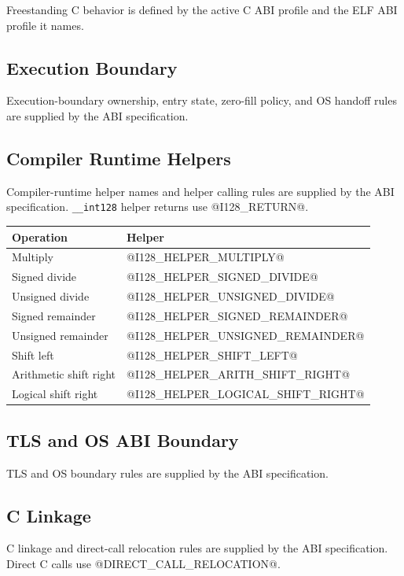 Freestanding C behavior is defined by the active C ABI profile and the ELF ABI
profile it names.

\subsection{Execution Boundary}
Execution-boundary ownership, entry state, zero-fill policy, and OS handoff
rules are supplied by the ABI specification.

\subsection{Compiler Runtime Helpers}
Compiler-runtime helper names and helper calling rules are supplied by the ABI
specification. \texttt{\_\_int128} helper returns use @I128_RETURN@.

\begingroup\footnotesize
\setlength{\tabcolsep}{2pt}
\begin{longtable}{@{}p{2.25in}p{3.25in}@{}}
\toprule
\textbf{Operation} & \textbf{Helper}\\
\midrule
\endhead
Multiply & @I128_HELPER_MULTIPLY@\\
Signed divide & @I128_HELPER_SIGNED_DIVIDE@\\
Unsigned divide & @I128_HELPER_UNSIGNED_DIVIDE@\\
Signed remainder & @I128_HELPER_SIGNED_REMAINDER@\\
Unsigned remainder & @I128_HELPER_UNSIGNED_REMAINDER@\\
Shift left & @I128_HELPER_SHIFT_LEFT@\\
Arithmetic shift right & @I128_HELPER_ARITH_SHIFT_RIGHT@\\
Logical shift right & @I128_HELPER_LOGICAL_SHIFT_RIGHT@\\
\bottomrule
\end{longtable}
\endgroup

\subsection{TLS and OS ABI Boundary}
TLS and OS boundary rules are supplied by the ABI specification.

\subsection{C Linkage}
C linkage and direct-call relocation rules are supplied by the ABI
specification. Direct C calls use @DIRECT_CALL_RELOCATION@.

